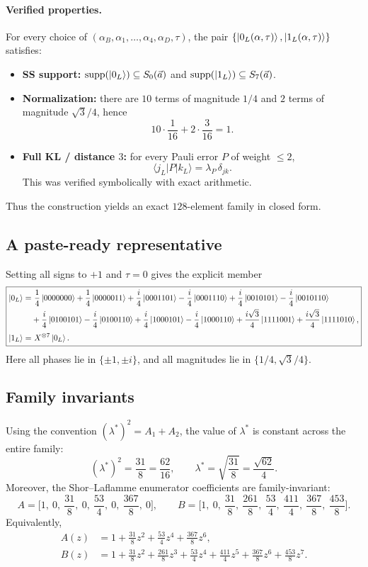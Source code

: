 \documentclass[11pt]{article}
\begin{document}
\paragraph{Verified properties.}
For every choice of \((\alpha_B,\alpha_1,\ldots,\alpha_4,\alpha_D,\tau)\), the pair
\(\{\ket{0_L(\alpha,\tau)},\ket{1_L(\alpha,\tau)}\}\) satisfies:
\begin{itemize}
\item \textbf{SS support:} \(\mathrm{supp}(\ket{0_L})\subseteq S_0(\vec a)\) and \(\mathrm{supp}(\ket{1_L})\subseteq S_7(\vec a)\).
\item \textbf{Normalization:} there are \(10\) terms of magnitude \(1/4\) and \(2\) terms of magnitude \(\sqrt3/4\), hence
\[
10\cdot\frac{1}{16}+2\cdot\frac{3}{16}=1.
\]
\item \textbf{Full KL / distance \(3\):} for every Pauli error \(P\) of weight \(\le 2\),
\[
\langle j_L|P|k_L\rangle=\lambda_P\,\delta_{jk}.
\]
This was verified symbolically with exact arithmetic.
\end{itemize}
Thus the construction yields an exact \(128\)-element family in closed form.

\subsection{A paste-ready representative}
Setting all signs to \(+1\) and \(\tau=0\) gives the explicit member
\[
\boxed{
\begin{aligned}
\ket{0_L}=
&\ \frac{1}{4}\ket{0000000}
+\frac{1}{4}\ket{0000011}
+\frac{i}{4}\ket{0001101}
-\frac{i}{4}\ket{0001110}
+\frac{i}{4}\ket{0010101}
-\frac{i}{4}\ket{0010110}\\
&+\frac{i}{4}\ket{0100101}
-\frac{i}{4}\ket{0100110}
+\frac{i}{4}\ket{1000101}
-\frac{i}{4}\ket{1000110}
+\frac{i\sqrt3}{4}\ket{1111001}
+\frac{i\sqrt3}{4}\ket{1111010},\\[3pt]
\ket{1_L}=&\ X^{\otimes 7}\ket{0_L}.
\end{aligned}
}
\]
Here all phases lie in \(\{\pm 1,\pm i\}\), and all magnitudes lie in \(\{1/4,\sqrt3/4\}\).

\subsection{Family invariants}
Using the convention \((\lambda^\ast)^2=A_1+A_2\), the value of \(\lambda^\ast\) is constant across the entire family:
\[
(\lambda^\ast)^2=\frac{31}{8}=\frac{62}{16},
\qquad
\lambda^\ast=\sqrt{\frac{31}{8}}=\frac{\sqrt{62}}{4}.
\]
Moreover, the Shor--Laflamme enumerator coefficients are family-invariant:
\[
A=\Big[1,\ 0,\ \frac{31}{8},\ 0,\ \frac{53}{4},\ 0,\ \frac{367}{8},\ 0\Big],
\qquad
B=\Big[1,\ 0,\ \frac{31}{8},\ \frac{261}{8},\ \frac{53}{4},\ \frac{411}{4},\ \frac{367}{8},\ \frac{453}{8}\Big].
\]
Equivalently,
\begin{align*}
A(z)&=1+\frac{31}{8}z^2+\frac{53}{4}z^4+\frac{367}{8}z^6,\\
B(z)&=1+\frac{31}{8}z^2+\frac{261}{8}z^3+\frac{53}{4}z^4+\frac{411}{4}z^5+\frac{367}{8}z^6+\frac{453}{8}z^7.
\end{align*}
\end{document}
